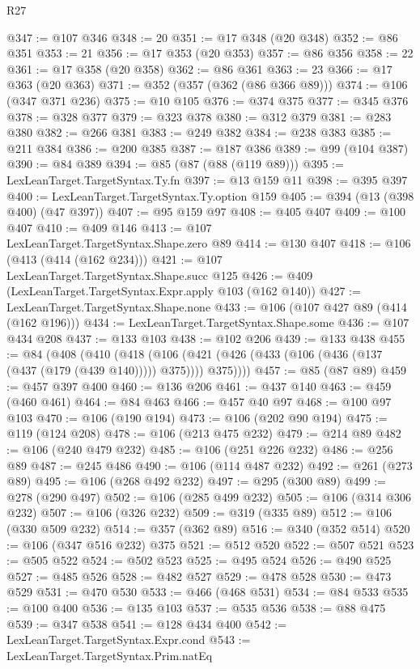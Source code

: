 \begin{lexlean}{R27}
\begin{coremodule}
@347 := @107 @346
@348 := 20
@351 := @17 @348 (@20 @348)
@352 := @86 @351
@353 := 21
@356 := @17 @353 (@20 @353)
@357 := @86 @356
@358 := 22
@361 := @17 @358 (@20 @358)
@362 := @86 @361
@363 := 23
@366 := @17 @363 (@20 @363)
@371 := @352 (@357 (@362 (@86 @366 @89)))
@374 := @106 (@347 @371 @236)
@375 := @10 @105
@376 := @374 @375
@377 := @345 @376
@378 := @328 @377
@379 := @323 @378
@380 := @312 @379
@381 := @283 @380
@382 := @266 @381
@383 := @249 @382
@384 := @238 @383
@385 := @211 @384
@386 := @200 @385
@387 := @187 @386
@389 := @99 (@104 @387)
@390 := @84 @389
@394 := @85 (@87 (@88 (@119 @89)))
@395 := LexLeanTarget.TargetSyntax.Ty.fn
@397 := @13 @159 @11
@398 := @395 @397
@400 := LexLeanTarget.TargetSyntax.Ty.option @159
@405 := @394 (@13 (@398 @400) (@47 @397))
@407 := @95 @159 @97
@408 := @405 @407
@409 := @100 @407
@410 := @409 @146
@413 := @107 LexLeanTarget.TargetSyntax.Shape.zero @89
@414 := @130 @407
@418 := @106 (@413 (@414 (@162 @234)))
@421 := @107 LexLeanTarget.TargetSyntax.Shape.succ @125
@426 := @409 (LexLeanTarget.TargetSyntax.Expr.apply @103 (@162 @140))
@427 := LexLeanTarget.TargetSyntax.Shape.none
@433 := @106 (@107 @427 @89 (@414 (@162 @196)))
@434 := LexLeanTarget.TargetSyntax.Shape.some
@436 := @107 @434 @208
@437 := @133 @103
@438 := @102 @206
@439 := @133 @438
@455 := @84
    (@408
      (@410
        (@418
          (@106 (@421 (@426 (@433 (@106 (@436 (@137 (@437 (@179 (@439 @140))))) @375)))) @375))))
@457 := @85 (@87 @89)
@459 := @457 @397 @400
@460 := @136 @206
@461 := @437 @140
@463 := @459 (@460 @461)
@464 := @84 @463
@466 := @457 @40 @97
@468 := @100 @97 @103
@470 := @106 (@190 @194)
@473 := @106 (@202 @90 @194)
@475 := @119 (@124 @208)
@478 := @106 (@213 @475 @232)
@479 := @214 @89
@482 := @106 (@240 @479 @232)
@485 := @106 (@251 @226 @232)
@486 := @256 @89
@487 := @245 @486
@490 := @106 (@114 @487 @232)
@492 := @261 (@273 @89)
@495 := @106 (@268 @492 @232)
@497 := @295 (@300 @89)
@499 := @278 (@290 @497)
@502 := @106 (@285 @499 @232)
@505 := @106 (@314 @306 @232)
@507 := @106 (@326 @232)
@509 := @319 (@335 @89)
@512 := @106 (@330 @509 @232)
@514 := @357 (@362 @89)
@516 := @340 (@352 @514)
@520 := @106 (@347 @516 @232) @375
@521 := @512 @520
@522 := @507 @521
@523 := @505 @522
@524 := @502 @523
@525 := @495 @524
@526 := @490 @525
@527 := @485 @526
@528 := @482 @527
@529 := @478 @528
@530 := @473 @529
@531 := @470 @530
@533 := @466 (@468 @531)
@534 := @84 @533
@535 := @100 @400
@536 := @135 @103
@537 := @535 @536
@538 := @88 @475
@539 := @347 @538
@541 := @128 @434 @400
@542 := LexLeanTarget.TargetSyntax.Expr.cond
@543 := LexLeanTarget.TargetSyntax.Prim.natEq

\end{coremodule}
\end{lexlean}
